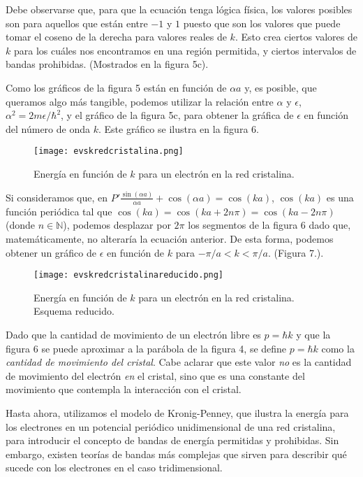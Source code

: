 \documentclass[12pt,a4paper]{article}
\begin{document}
Debe observarse que, para que la ecuación tenga lógica física, los valores posibles son para aquellos que están entre $-1$ y $1$ puesto que son los valores que puede tomar el coseno de la derecha para valores reales de $k$. Esto crea ciertos valores de $k$ para los cuáles nos encontramos en una región permitida, y ciertos intervalos de bandas prohibidas. (Mostrados en la figura 5c).

Como los gráficos de la figura 5 están en función de $\alpha a$ y, es posible, que queramos algo más tangible, podemos utilizar la relación entre $\alpha$ y $\epsilon$, $\alpha^{2}=2m\epsilon /\hbar^{2}$, y el gráfico de la figura 5c, para obtener la gráfica de $\epsilon$ en función del número de onda $k$. Este gráfico se ilustra en la figura 6.

\begin{figure}[ht!]
\begin{center}
\texttt{[image: evskredcristalina.png]}
\caption{Energía en función de $k$ para un electrón en la red cristalina.}
\end{center}
\end{figure}

Si consideramos que, en $ P' \frac{\sin(\alpha a)}{\alpha a} + \cos (\alpha a) = \cos(ka)$, $\cos(ka)$ es una función periódica tal que $\cos(ka)=\cos(ka+2n\pi)=\cos(ka-2n\pi)$ (donde $n \in \mathbb{N}$), podemos desplazar por $2\pi$ los segmentos de la figura 6 dado que, matemáticamente, no alteraría la ecuación anterior. De esta forma, podemos obtener un gráfico de $\epsilon$ en función de $k$ para $-\pi/a < k < \pi/a$. (Figura 7.).

\begin{figure}[ht!]
\begin{center}
\texttt{[image: evskredcristalinareducido.png]}
\caption{Energía en función de $k$ para un electrón en la red cristalina. Esquema reducido.}
\end{center}
\end{figure}

Dado que la cantidad de movimiento de un electrón libre es $p=\hbar k$ y que la figura 6 se puede aproximar a la parábola de la figura 4, se define $p=\hbar k$ como la \emph{cantidad de movimiento del cristal}. Cabe aclarar que este valor \emph{no} es la cantidad de movimiento del electrón \emph{en} el cristal, sino que es una constante del movimiento que contempla la interacción con el cristal.

Hasta ahora, utilizamos el modelo de Kronig-Penney, que ilustra la energía para los electrones en un potencial periódico unidimensional de una red cristalina, para introducir el concepto de bandas de energía permitidas y prohibidas. Sin embargo, existen teorías de bandas más complejas que sirven para describir qué sucede con los electrones en el caso tridimensional.
\end{document}
